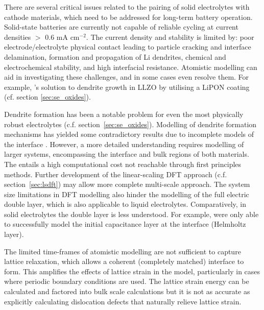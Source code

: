 \documentclass[../main.tex]{subfiles}
\begin{document}
There are several critical issues related to the pairing of solid electrolytes with cathode materials, which need to be addressed for long-term battery operation. Solid-state batteries are currently not capable of reliable cycling at current densities $>$ 0.6 mA cm$^{-2}$\cite{famprikis_fundamentals_2019, Albertus2018}. The current density and stability is limited by: poor electrode/electrolyte physical contact leading to particle cracking and interface delamination, formation and propagation of Li dendrites, chemical and electrochemical stability, and high interfacial resistance. \cite{famprikis_fundamentals_2019} Atomistic modelling can aid in investigating these challenges, and in some cases even resolve them. For example, \citeauthor{Tian2018}'s solution to dendrite growth in LLZO by utilising a LiPON coating\cite{Tian2018} (cf. section \ref{sec:se_oxides}). 

Dendrite formation has been a notable problem for even the most physically robust electrolytes (c.f. section~\ref{sec:se_oxides}). Modelling of dendrite formation mechanisms has yielded some contradictory results due to incomplete models of the interface \cite{Tian2018, Gao2020, Canepa2018}. However, a more detailed understanding requires modelling of larger systems, encompassing the interface and bulk regions of both materials. The entails a high computational cost not reachable through first principles methods. Further development of the linear-scaling DFT approach (c.f. section~\ref{sec:lsdft}) may allow more complete multi-scale approach. The system size limitations in DFT modelling also hinder the modelling of the full electric double layer, which is also applicable to liquid electrolytes. Comparatively, in solid electrolytes the double layer is less understood. For example, \citeauthor{Tateyama2019} were only able to successfully model the initial capacitance layer at the interface (Helmholtz layer).\cite{Tateyama2019}

The limited time-frames of atomistic modelling are not sufficient to capture lattice relaxation, which allows a coherent (completely matched) interface to form. This amplifies the effects of lattice strain in the model, particularly in cases where periodic boundary conditions are used. \cite{Lepley2015} The lattice strain energy can be calculated and factored into bulk scale calculations but it is not as accurate as explicitly calculating dislocation defects that naturally relieve lattice strain.\cite{Rodney2017, Clouet2020}
\end{document}
